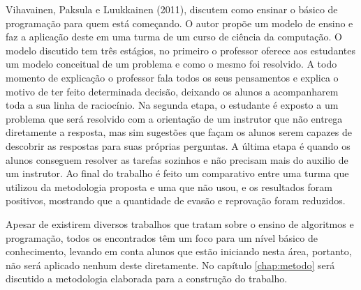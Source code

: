 \nocite{Vihavainen:2011:EAM:1953163.1953196}
Vihavainen, Paksula e Luukkainen (2011), discutem como ensinar o básico de programação para quem está começando. O autor propõe um modelo de ensino e faz a aplicação deste em uma turma de um curso de ciência da computação. O modelo discutido tem três estágios, no primeiro
o professor oferece aos estudantes um modelo conceitual de um problema e como o mesmo foi resolvido. A todo momento de explicação o professor fala todos os seus pensamentos e explica o motivo de ter feito determinada decisão, deixando os alunos a acompanharem toda a sua linha de raciocínio. Na segunda etapa, o estudante é exposto a um problema que será resolvido com a orientação de um instrutor que não entrega diretamente a resposta, mas sim sugestões que façam os alunos serem capazes de descobrir as respostas para suas próprias perguntas. A última etapa é quando os alunos conseguem resolver as tarefas sozinhos e não precisam mais do auxilio de um instrutor. Ao final do trabalho é feito um comparativo entre uma turma que utilizou da metodologia proposta e uma que não usou, e os resultados foram positivos, mostrando que a quantidade de evasão e reprovação foram reduzidos.

Apesar de existirem diversos trabalhos que tratam sobre o ensino de algoritmos e programação, todos os encontrados têm um foco para um nível básico de conhecimento, levando em conta alunos que estão iniciando nesta área, portanto, não será aplicado nenhum deste diretamente. No capítulo \ref{chap:metodo} será discutido a metodologia elaborada para a construção do trabalho.
 



